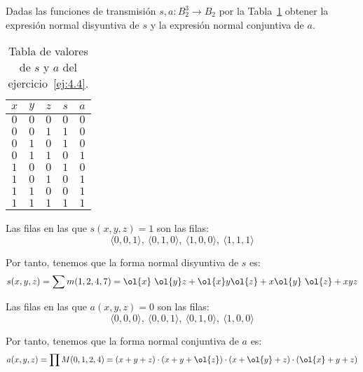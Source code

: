 \begin{ejercicio} \label{ej:4.4}
    Dadas las funciones de transmisión $s,a:B_2^3\to B_2$ por la Tabla~\ref{tab:4.4} obtener la expresión normal disyuntiva de $s$
    y la expresión normal conjuntiva de $a$.
    \begin{table}[H]
        \centering
        \begin{tabular}{ccc|cc}
            $x$ & $y$ & $z$ & $s$ & $a$\\
            \hline
            $0$ & $0$ & $0$ & $0$ & $0$\\
            $0$ & $0$ & $1$ & $1$ & $0$\\
            $0$ & $1$ & $0$ & $1$ & $0$\\
            $0$ & $1$ & $1$ & $0$ & $1$\\
            $1$ & $0$ & $0$ & $1$ & $0$\\
            $1$ & $0$ & $1$ & $0$ & $1$\\
            $1$ & $1$ & $0$ & $0$ & $1$\\
            $1$ & $1$ & $1$ & $1$ & $1$
        \end{tabular}
        \caption{Tabla de valores de $s$ y $a$ del ejercicio~\ref{ej:4.4}.}
        \label{tab:4.4}
    \end{table}

    Las filas en las que $s(x,y,z)=1$ son las filas:
    \begin{equation*}
        \langle 0,0,1\rangle,~\langle 0,1,0\rangle,~\langle 1,0,0\rangle,~\langle 1,1,1\rangle
    \end{equation*}

    Por tanto, tenemos que la forma normal disyuntiva de $s$ es:
    \begin{equation*}
        s(x,y,z)
        = \sum m(1,2,4,7)
        = \ol{x}~\ol{y}z + \ol{x}y\ol{z} + x\ol{y}~\ol{z} + xyz
    \end{equation*}

    Las filas en las que $a(x,y,z)=0$ son las filas:
    \begin{equation*}
        \langle 0,0,0\rangle,~\langle 0,0,1\rangle,~\langle 0,1,0\rangle,~\langle 1,0,0\rangle
    \end{equation*}

    Por tanto, tenemos que la forma normal conjuntiva de $a$ es:
    \begin{equation*}
        a(x,y,z)
        = \prod M(0,1,2,4)
        = (x+y+z)\cdot (x+y+\ol{z})\cdot (x+\ol{y}+z)\cdot (\ol{x}+y+z)
    \end{equation*}
\end{ejercicio}


